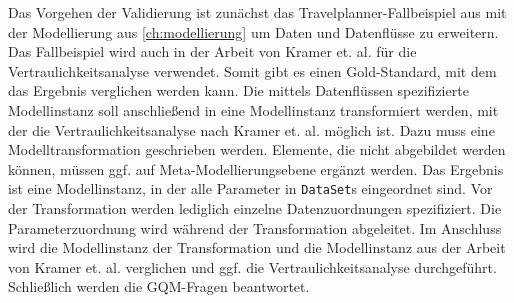 Das Vorgehen der Validierung ist zunächst das Travelplanner-Fallbeispiel aus \cite{Stenzel2014} mit der Modellierung aus \autoref{ch:modellierung} um Daten und Datenflüsse zu erweitern. Das Fallbeispiel wird auch in der Arbeit von Kramer et. al. \cite{Kramera} für die Vertraulichkeitsanalyse verwendet. Somit gibt es einen Gold-Standard, mit dem das Ergebnis verglichen werden kann. Die mittels Datenflüssen spezifizierte Modellinstanz soll anschließend in eine Modellinstanz transformiert werden, mit der die Vertraulichkeitsanalyse nach Kramer et. al. \cite{Kramera} möglich ist. Dazu muss eine Modelltransformation geschrieben werden. Elemente, die nicht abgebildet werden können, müssen ggf. auf Meta-Modellierungsebene ergänzt werden. Das Ergebnis ist eine Modellinstanz, in der alle Parameter in \texttt{DataSet}s eingeordnet sind. Vor der Transformation werden lediglich einzelne Datenzuordnungen spezifiziert. Die Parameterzuordnung wird während der Transformation abgeleitet. Im Anschluss wird die Modellinstanz der Transformation und die Modellinstanz aus der Arbeit von Kramer et. al. \cite{Kramera} verglichen und ggf. die Vertraulichkeitsanalyse durchgeführt. Schließlich werden die GQM-Fragen beantwortet.

